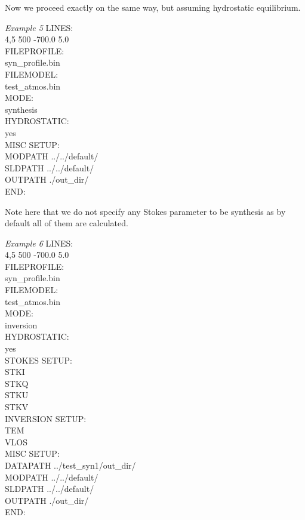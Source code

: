 %

Now we proceed exactly on the same way, but assuming hydrostatic equilibrium.

\begin{ifbox}[label={tb:example05}]{{\it Example 5}}
  \scriptsize
LINES:\\
4,5 500 -700.0 5.0\\
FILEPROFILE:\\
syn\_profile.bin\\
FILEMODEL:\\
test\_atmos.bin\\
MODE:\\
synthesis\\
HYDROSTATIC:\\
yes\\
MISC SETUP:\\
MODPATH ../../default/\\
SLDPATH ../../default/\\
OUTPATH ./out\_dir/\\
END:
  \normalsize
\end{ifbox}

Note here that we do not specify any Stokes parameter to be synthesis as by default all of them are calculated.

%

\begin{ifbox}[label={tb:example06}]{{\it Example 6}}
  \scriptsize
LINES:\\
4,5 500 -700.0 5.0\\
FILEPROFILE:\\
syn\_profile.bin\\
FILEMODEL:\\
test\_atmos.bin\\
MODE:\\
inversion\\
HYDROSTATIC:\\
yes\\
STOKES SETUP:\\
STKI\\
STKQ\\
STKU\\
STKV\\
INVERSION SETUP:\\
TEM\\
VLOS\\
MISC SETUP:\\
DATAPATH ../test\_syn1/out\_dir/\\
MODPATH ../../default/\\
SLDPATH ../../default/\\
OUTPATH ./out\_dir/\\
END:
  \normalsize
\end{ifbox}




%





%




